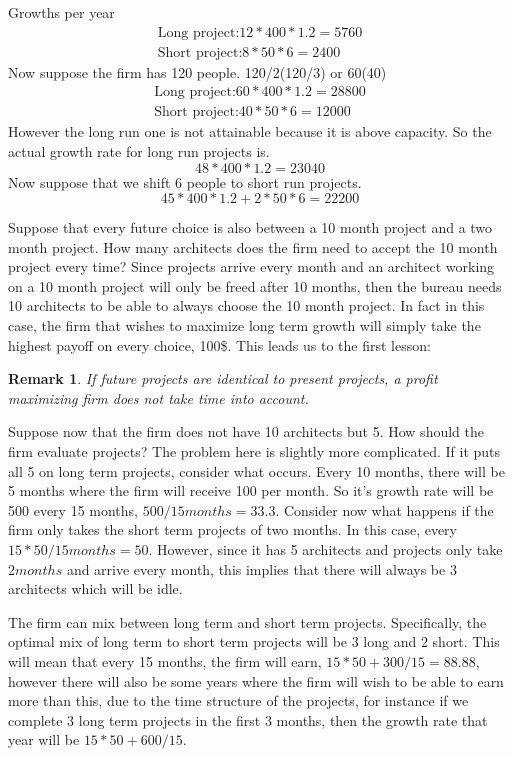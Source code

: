 \documentclass[12pt]{report}
\newtheorem{remark}{Remark}
\numberwithin{equation}{section}
\begin{document}
Growths per year
\begin{align*}
\text{Long project:}  12*400*1.2=5760 \\
\text{Short project:} 8*50*6 = 2400
\end{align*}
Now suppose the firm has 120 people.  120/2(120/3) or 60(40)
\begin{align*}
\text{Long project:}  60*400*1.2=28 800 \\
\text{Short project:} 40*50*6 = 12 000
\end{align*}
However the long run one is not attainable because it is above capacity. So the actual growth rate for long run projects is. 
\begin{equation*}
48*400*1.2= 23 040
\end{equation*}
Now suppose that we shift 6 people to short run projects. 
\begin{equation*}
45*400*1.2 + 2*50*6= 22 200
\end{equation*}

Suppose that every future choice is also between a 10 month project and a two month project. How many architects does the firm need to accept the 10 month project every time? Since projects arrive every month and an architect working on a 10 month project will only be freed after 10 months, then the bureau needs 10 architects to be able to always choose the 10 month project. In fact in this case, the firm that wishes to maximize long term growth will simply take the highest payoff on every choice, 100\$. This leads us to the first lesson:

\begin{remark}
If future projects are identical to present projects, a profit maximizing firm does not take time into account. 
\end{remark}

Suppose now that the firm does not have 10 architects but 5. How should the firm evaluate projects? The problem here is slightly more complicated. If it puts all 5 on long term projects, consider what occurs. Every 10 months, there will be 5 months where the firm will receive 100 per month. So it's growth rate will be 500 every 15 months, $500/15months=33.3$. Consider now what happens if the firm only takes the short term projects of two months. In this case, every $15*50/15 months=50$. However, since it has 5 architects and projects only take $2 months$ and arrive every month, this implies that there will always be 3 architects which will be idle. 

The firm can mix between long term and short term projects. Specifically, the optimal mix of long term to short term projects will be $3$ long and $2$ short. This will mean that every 15 months, the firm will earn, $15*50+300/15=88.88$, however there will also be some years where the firm will wish to be able to earn more than this, due to the time structure of the projects, for instance if we complete 3 long term projects in the first 3 months, then the growth rate that year will be $15*50+600/15$. 
\end{document}
